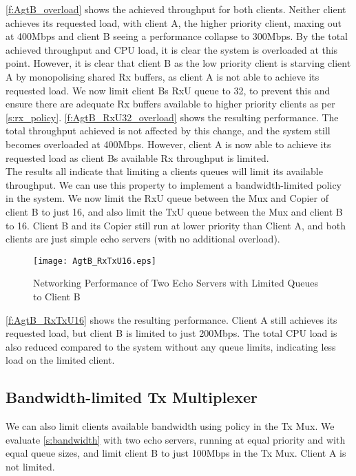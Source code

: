 \autoref{f:AgtB_overload} shows the achieved throughput for both clients. Neither client achieves its requested load, with client A,
the higher priority client, maxing out at 400Mbps and client B seeing a performance collapse to 300Mbps. By the total achieved throughput
and CPU load, it is clear the system is overloaded at this point. However, it is clear that client B as the low priority client is 
starving client A by monopolising shared Rx buffers, as client A is not able to achieve its requested load. We now limit client Bs RxU queue
to 32, to prevent this and ensure there are adequate Rx buffers available to higher priority clients as per \autoref{s:rx_policy}. 
\autoref{f:AgtB_RxU32_overload} shows the resulting performance. The total throughput achieved is not affected by this change, and the
system still becomes overloaded at 400Mbps. However, client A is now able to achieve its requested load as client Bs available
Rx throughput is limited. \\

The results all indicate that limiting a clients queues will limit its available throughput. We can use this property to implement 
a bandwidth-limited policy in the system. We now limit the RxU queue between the Mux and Copier of client B to just 16, and also
limit the TxU queue between the Mux and client B to 16. Client B and its Copier still run at lower priority than Client A, and both
clients are just simple echo servers (with no additional overload).

\begin{figure}[h]
    \centering
    \texttt{[image: AgtB\_RxTxU16.eps]}
    \caption{Networking Performance of Two Echo Servers with Limited Queues to Client B}
    \label{f:AgtB_RxTxU16}
\end{figure}

\autoref{f:AgtB_RxTxU16} shows the resulting performance. Client A still achieves its requested load, but client B is limited
to just 200Mbps. The total CPU load is also reduced compared to the system without any queue limits, indicating less load on 
the limited client.

\subsection{Bandwidth-limited Tx Multiplexer}

We can also limit clients available bandwidth using policy in the Tx Mux. We evaluate \autoref{s:bandwidth} with two echo servers,
running at equal priority and with equal queue sizes, and limit client B to just 100Mbps in the Tx Mux. Client A is not limited.

